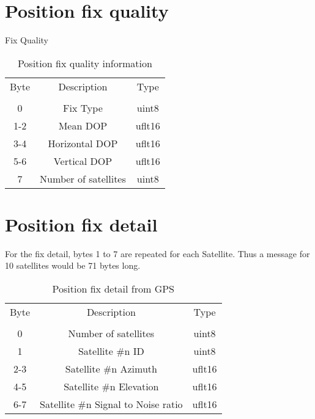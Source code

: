 \section{Position fix quality}
\label{msg004}
Fix Quality
\begin{table}[H]
  \centering
  \begin{tabular}{ c c c }
  Byte & Description & Type \\
              &      &              \\
\hline
    0  & Fix Type             & uint8  \\
   1-2 & Mean DOP             & uflt16 \\
   3-4 & Horizontal DOP       & uflt16 \\
   5-6 & Vertical DOP         & uflt16 \\
    7  & Number of satellites & uint8  \\
  \end{tabular}
  \caption{Position fix quality information}
\end{table}

\section{Position fix detail}
\label{msg005}
For the fix detail, bytes 1 to 7 are repeated for each Satellite. Thus a message for 10 satellites would be 71 bytes long. 

\begin{table}[H]
  \centering
  \begin{tabular}{ c c c }
  Byte & Description & Type \\
              &      &              \\
\hline
    0  & Number of satellites               & uint8  \\
    1  & Satellite \#n ID                   & uint8  \\
   2-3 & Satellite \#n Azimuth               & uflt16 \\
   4-5 & Satellite \#n Elevation             & uflt16 \\
   6-7 & Satellite \#n Signal to Noise ratio & uflt16 \\
  \end{tabular}
  \caption{Position fix detail from GPS}
\end{table}

